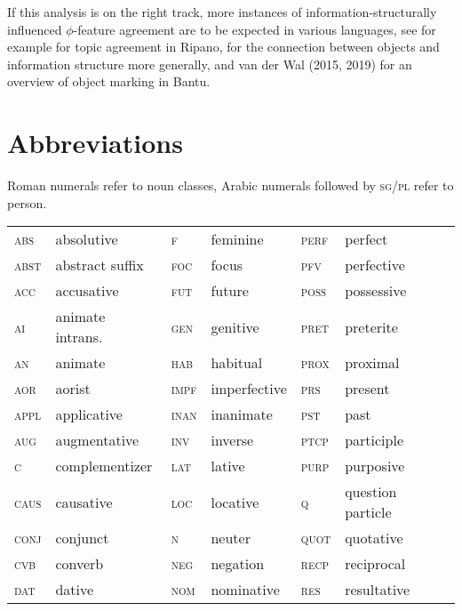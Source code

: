 \documentclass[output=paper
,modfonts
,nonflat]{langsci/langscibook}
\begin{document}
If this analysis is on the right track, more instances of information-structurally influenced $ \phi $-feature agreement are to be expected in various languages, see for example  for topic agreement in Ripano, \citet{Dalrymple_Nikolaeva2011} for the connection between objects and information structure more generally, and van der Wal (2015, 2019) for an overview of object marking in Bantu. \nocite{Van_der_Wal2015,chapters/07-van-der-wal} %

\section*{Abbreviations}
Roman numerals refer to noun classes, Arabic numerals followed by \textsc{sg/pl} refer to person.
\begin{table}
	\begin{tabular}{llllll} 
	\textsc{abs} 	&	 absolutive 	&	\textsc{f} 	&	  feminine 	&	  \textsc{perf} 	&	   perfect 	\\
\textsc{abst} 	&	  abstract suffix 	&	  \textsc{foc} 	&	  focus	&	  \textsc{pfv} 	&	  perfective 	\\
\textsc{acc} 	&	  accusative 	&	  \textsc{fut} 	&	  future	&	  \textsc{poss}  	&	 possessive 	\\
\textsc{ai} 	&	  animate intrans. 	&	  \textsc{gen} 	&	  genitive  	&	  \textsc{pret} 	&	  preterite 	\\
\textsc{an} 	&	  animate 	&	  \textsc{hab} 	&	  habitual 	&	  \textsc{prox}  	&	 proximal 	\\
\textsc{aor} 	&	  aorist 	&	  \textsc{impf} 	&	  imperfective	&	  \textsc{prs} 	&	  present 	\\
\textsc{appl} 	&	  applicative 	&	  \textsc{inan} 	&	  inanimate	&	  \textsc{pst} 	&	  past 	\\
\textsc{aug} 	&	  augmentative 	&	  \textsc{inv} 	&	  inverse	&	  \textsc{ptcp} 	&	  participle 	\\
\textsc{c}	&	complementizer	&	  \textsc{lat} 	&	  lative 	&	  \textsc{purp}  	&	 purposive 	\\
\textsc{caus} 	&	  causative 	&	  \textsc{loc} 	&	  locative	&	\textsc{q}	&	question particle	\\
\textsc{conj} 	&	  conjunct 	&	  \textsc{n} 	&	  neuter 	&	  \textsc{quot} 	&	  quotative 	\\
\textsc{cvb} 	&	  converb 	&	  \textsc{neg} 	&	  negation 	&	\textsc{recp}	&	reciprocal	\\
\textsc{dat} 	&	  dative 	&	  \textsc{nom} 	&	  nominative 	&	  \textsc{res} 	&	  resultative 	\\

\end{tabular}
\end{table}
\end{document}
